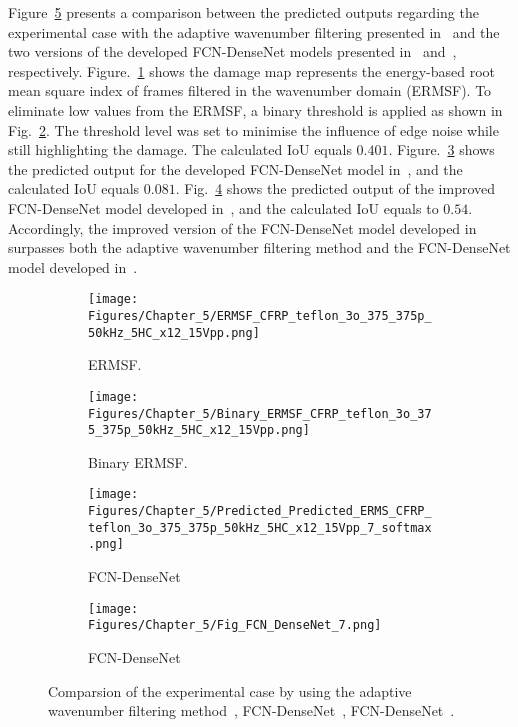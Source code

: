 Figure~\ref{fig:exp_erms_case_comp} presents a comparison between the predicted outputs regarding the experi\-mental case with the adaptive wavenumber filtering presented in~\cite{Kudela2015, Radzienski2019} and the two versions of the developed FCN-DenseNet models presented in~\cite{Ijjeh2021} and~\cite{Ijjeh2022}, respectively.
Figure.~\ref{fig:ERMSF} shows the damage map represents the energy-based root mean square index of frames filtered in the wavenumber domain (ERMSF).
To eliminate low values from the ERMSF, a binary threshold is applied as shown in Fig.~\ref{fig:Binary_ERMSF}.
The threshold level was set to minimise the influence of edge noise while still highlighting the damage.
The calculated IoU equals $0.401$.
Figure.~\ref{fig:FCN_densenet_2021} shows the predicted output for the developed FCN-DenseNet model in~\cite{Ijjeh2021}, and the calculated IoU equals $0.081$. 
Fig.~\ref{fig:FCN_densenet_2022} shows the predicted output of the improved FCN-DenseNet model developed in~\cite{Ijjeh2022}, and the calculated IoU equals to $0.54$.
Accordingly, the improved version of the FCN-DenseNet model developed in~\cite{Ijjeh2022} surpasses both the adaptive wavenumber filtering method and the FCN-DenseNet model developed in~\cite{Ijjeh2021}.
\begin{figure} [!h]
	\centering
	\begin{subfigure}[b]{.48\textwidth}
		\centering
		\texttt{[image: Figures/Chapter\_5/ERMSF\_CFRP\_teflon\_3o\_375\_375p\_50kHz\_5HC\_x12\_15Vpp.png]}
		\caption{ERMSF.}
		\label{fig:ERMSF}
	\end{subfigure}
	\hfill
	\begin{subfigure}[b]{.48\textwidth}
		\centering
		\texttt{[image: Figures/Chapter\_5/Binary\_ERMSF\_CFRP\_teflon\_3o\_375\_375p\_50kHz\_5HC\_x12\_15Vpp.png]}
		\caption{Binary ERMSF.}
		\label{fig:Binary_ERMSF}	
	\end{subfigure}
	\hfill
	\begin{subfigure}[b]{.48\textwidth}
		\centering
		\texttt{[image: Figures/Chapter\_5/Predicted\_Predicted\_ERMS\_CFRP\_teflon\_3o\_375\_375p\_50kHz\_5HC\_x12\_15Vpp\_7\_softmax.png]}
		\caption{FCN-DenseNet~\cite{Ijjeh2021}}
		\label{fig:FCN_densenet_2021}
	\end{subfigure}
	\hfill
	\begin{subfigure}[b]{.48\textwidth}
		\centering
		\texttt{[image: Figures/Chapter\_5/Fig\_FCN\_DenseNet\_7.png]}
		\caption{FCN-DenseNet~\cite{Ijjeh2022}}
		\label{fig:FCN_densenet_2022}	
	\end{subfigure}
	\caption{Comparsion of the experimental case by using the adaptive wavenumber filtering method~\cite{Kudela2015, Radzienski2019}, FCN-DenseNet~\cite{Ijjeh2021}, FCN-DenseNet~\cite{Ijjeh2022}.}
	\label{fig:exp_erms_case_comp}
\end{figure}

